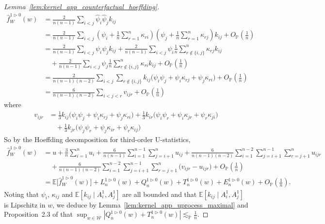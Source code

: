 \documentclass[11pt,lof]{puthesis}
\renewcommand{\P}{\ensuremath{\mathbb{P}}}
\newcommand{\E}{\ensuremath{\mathbb{E}}}
\newcommand{\cW}{\ensuremath{\mathcal{W}}}
\theoremstyle{break}
\theoremstyle{proof}
\newtheorem{proof}{Proof}
\begin{document}
\begin{proof}[Lemma~\ref{lem:kernel_app_counterfactual_hoeffding}]
%
\begin{align*}
\hat f_W^{1 \triangleright 0}(w)
&=
\frac{2}{n(n-1)}
\sum_{i < j}
\hat \psi_i
\hat \psi_j
k_{i j} \\
&=
\frac{2}{n(n-1)}
\sum_{i < j}
\left(
\psi_i
+ \frac{1}{n}
\sum_{r=1}^n \kappa_{r i}
\right)
\left(
\psi_j
+ \frac{1}{n}
\sum_{r=1}^n \kappa_{r j}
\right)
k_{i j}
+ O_\P\left(\frac{1}{n}\right) \\
&=
\frac{2}{n(n-1)}
\sum_{i < j}
\psi_i
\psi_j
k_{i j}
+ \frac{2}{n(n-1)}
\sum_{i < j}
\psi_i
\frac{1}{n}
\sum_{r \notin \{i,j\}}^n \kappa_{r j}
k_{i j} \\
&\quad+
\frac{2}{n(n-1)}
\sum_{i < j}
\psi_j
\frac{1}{n}
\sum_{r \notin \{i,j\}}^n \kappa_{r i}
k_{i j}
+ O_\P\left(\frac{1}{n}\right) \\
&=
\frac{2}{n(n-1)(n-2)}
\sum_{i < j}
\sum_{r \notin \{i,j\}}
k_{i j}
\Big(
\psi_i
\psi_j
+\psi_i
\kappa_{r j}
+\psi_j
\kappa_{r i}
\Big)
+ O_\P\left(\frac{1}{n}\right) \\
&=
\frac{6}{n(n-1)(n-2)}
\sum_{i < j < r}
v_{i j r}
+ O_\P\left(\frac{1}{n}\right)
\end{align*}
%
where
%
\begin{align*}
v_{i j r}
&=
\frac{1}{3}
k_{i j} \Big(\psi_i \psi_j +\psi_i \kappa_{r j} +\psi_j \kappa_{r i} \Big)
+ \frac{1}{3}
k_{i r} \Big(\psi_i \psi_r +\psi_i \kappa_{jr} +\psi_r \kappa_{j i} \Big) \\
&\quad+
\frac{1}{3}
k_{jr} \Big(\psi_j \psi_r +\psi_j \kappa_{i r} +\psi_r \kappa_{i j} \Big)
\end{align*}
%
So by the Hoeffding decomposition for third-order U-statistics,
%
\begin{align*}
\hat f_W^{1 \triangleright 0}(w)
&=
u
+ \frac{3}{n}
\sum_{i=1}^n
u_i
+ \frac{6}{n(n-1)}
\sum_{i=1}^{n-1}
\sum_{j=i+1}^n
u_{i j}
+ \frac{6}{n(n-1)(n-2)}
\sum_{i=1}^{n-2}
\sum_{j=i+1}^{n-1}
\sum_{r=j+1}^n
u_{i j r} \\
&\quad+
\frac{6}{n(n-1)(n-2)}
\sum_{i=1}^{n-2}
\sum_{j=i+1}^{n-1}
\sum_{r=j+1}^n
\big(v_{i j r} - u_{i j r}\big)
+ O_\P\left( \frac{1}{n} \right) \\
&=
\E\big[\hat f_W^{1 \triangleright 0}(w) \big]
+ L_n^{1 \triangleright 0}(w)
+ Q_n^{1 \triangleright 0}(w)
+ T_n^{1 \triangleright 0}(w)
+ E_n^{1 \triangleright 0}(w)
+ O_\P\left( \frac{1}{n} \right).
\end{align*}
%
Noting that $\psi_i$, $\kappa_{i j}$
and $\E[k_{i j} \mid A_i^1, A_j^1]$
are all bounded and that
$\E[k_{i j} \mid A_i^1, A_j^1]$
is Lipschitz in $w$,
we deduce by
Lemma~\ref{lem:kernel_app_uprocess_maximal}
and Proposition~2.3 of
\citet{arcones1993limit} that
$\sup_{w \in \cW} |Q_n^{1 \triangleright 0}(w)
+ T_n^{1 \triangleright 0}(w)| \lesssim_\P \frac 1n$.
%
\end{proof}
\end{document}

